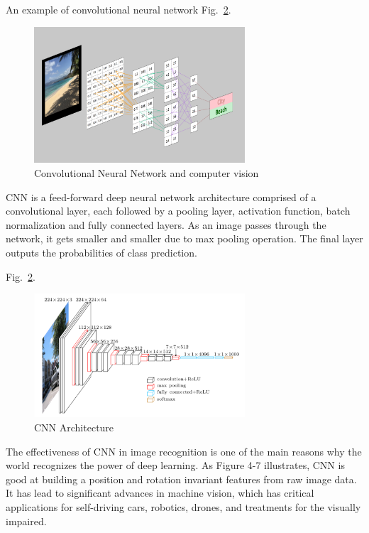 An example of convolutional neural network Fig.~\ref{fig:CNN-1}.
\begin{figure}[htbp]
\centering
\includegraphics[width=0.7\textwidth]{images/CNN.png}
\caption{Convolutional Neural Network and computer vision}
\label{fig:CNN-1}
\end{figure}

CNN is a feed-forward deep neural network architecture comprised of a convolutional layer, each followed by a pooling layer, activation function,  batch normalization and fully connected layers. As an image passes through the network, it gets smaller and smaller due to max pooling operation. The final layer outputs the probabilities of class prediction.

Fig.~\ref{fig:CNN-1}.
\begin{figure}[htbp]
\centering
\includegraphics[width=0.7\textwidth]{images/cnn-architecture.png}
\caption{CNN Architecture}
\label{fig:CNN-1}
\end{figure}


The effectiveness of CNN in image recognition is one of the main reasons why the world recognizes the power of deep learning. As Figure 4-7 illustrates, CNN is good at building a position and rotation invariant features from raw image data. It has lead to significant advances in machine vision, which has critical applications for self-driving cars, robotics, drones, and treatments for the visually impaired.

